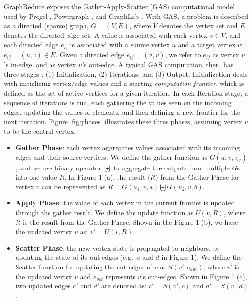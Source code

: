 GraphReduce exposes the Gather-Apply-Scatter (GAS) computational model used by Pregel \cite{pregel}, Powergraph \cite{powergraph}, and GraphLab \cite{graphlab}.
With GAS, a problem is described as a directed (sparse) graph, $G = (V, E)$, where $V$ denotes the vertex set and $E$ denotes 
the directed edge set. A value is associated with each vertex $v\in V$, and each directed edge $e_{ij}$ is associated with 
a source vertex $u$ and a target vertex $v$: $e_{ij} =(u, v) \in E$. Given a directed edge $e_{ij} = (u, v)$, we refer to 
$e_{ij}$ as vertex $v$'s in-edge, and as vertex $u$'s out-edge. A typical GAS computation, then, has three stages \cite{vertexapi}: 
(1) Initialization, (2) Iterations, and (3) Output. Initialization deals with initializing vertex/edge values and a starting 
{\em computation frontier}, which is defined as the set of active vertices for a given iteration. In each Iteration stage, 
a sequence of iterations is run, each gathering the values seen on the incoming edges, updating the values of elements, and 
then defining a new frontier for the next iteration. Figure \ref{fig:phases} illustrates these three phases, assuming vertex $v$ to be the 
central vertex.


\begin{itemize}
  \item {\bf Gather Phase}: each vertex aggregates values associated with its incoming edges and their source vertices. 
We define the gather function as $G(u, v, e_{ij})$, and we use binary operator $\biguplus$ to aggregate the outputs 
from multiple $G$s into one value $R$. In Figure 1 (a), the result ($R$) from the Gather Phase for vertex $v$ can be represented 
as $R= G(u_1, v, a)\biguplus G(u_2, v, b)$. 
  \item {\bf Apply Phase}: the value of each vertex in the current frontier is updated through the gather result. 
We define the update function as $U(v, R)$, where $R$ is the result from the Gather Phase. Shown in the Figure 1 (b), 
we have the updated vertex $v$ as: $v' = U(v, R)$.  
  \item {\bf Scatter Phase}: the new vertex state is propagated to neighbors, by updating the state of its out-edges 
(e.g., $c$ and $d$ in Figure 1). We define the Scatter function for updating the out-edges of $v$ as $S(v', e_{out})$, 
where $v'$ is the updated vertex $v$ and $e_{out}$ represents $v$'s out-edges. Shown in Figure 1 (c), two updated edges 
$c'$ and $d'$ are denoted as: $c' = S(v', c)$ and $d' = S(v', d)$.
\end{itemize} 


